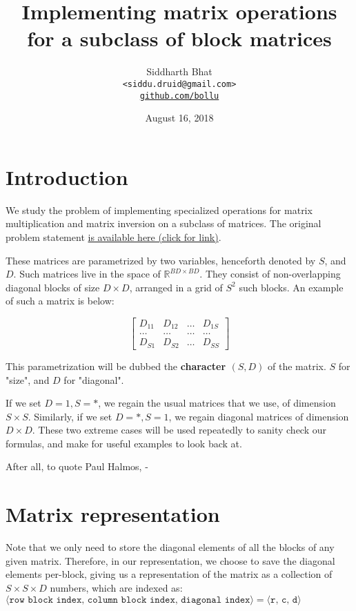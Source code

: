 \documentclass[11pt]{article}
\title{Implementing matrix operations for a subclass of block matrices}
\author{Siddharth Bhat \\
    \texttt{<siddu.druid@gmail.com>} \\
    \href{http://www.github.com/bollu}{\texttt{github.com/bollu}}
}
\date{August 16, 2018}
\begin{document}
\newcommand{\bigO}{\mathcal{O}}
\maketitle

\section{Introduction}

We study the problem of implementing specialized operations for
matrix multiplication and matrix inversion on a subclass of matrices. The
original problem statement
\href{http://hal.cse.msu.edu/misc/join/}{is available here (click for link)}.

These matrices are parametrized by two variables, henceforth denoted by
$S$, and $D$. Such matrices live in the space of $\mathbb{R}^{BD \times BD}$.
They consist of non-overlapping diagonal blocks of size $D \times D$, arranged
in a grid of $S^2$ such blocks. An example of such a matrix is below:

$$
\begin{bmatrix}
    D_{11} & D_{12} &\dots & D_{1S} \\
    \dots & \dots   & \dots & \dots \\
    D_{S1} & D_{S2} & \dots &  D_{SS}
\end{bmatrix}
$$

This parametrization will be dubbed the \textbf{character $(S, D)$} of the matrix.
$S$ for "size", and $D$ for "diagonal".

If we set $D = 1, S = *$, we regain the usual matrices that we use, of dimension
$S \times S$. Similarly, if we set $D = *, S = 1$, we regain diagonal matrices
of dimension $D \times D$. These two extreme cases will be used repeatedly to
sanity check our formulas, and make for useful examples to look back at.

After all, to quote Paul Halmos, - 


\section{Matrix representation}
Note that we only need to store the diagonal elements of all the blocks of any
given matrix. Therefore, in our representation, we choose to save the diagonal
elements per-block, giving us a representation of the matrix as a collection of
$S \times S \times D$ numbers, which are indexed as:
$\langle\texttt{row block index, column block index, diagonal index} \rangle = \langle \texttt{r, c, d} \rangle$
\end{document}
